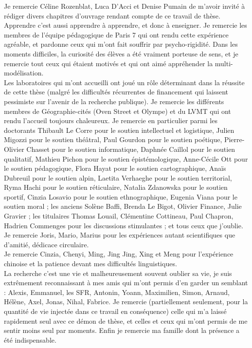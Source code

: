 Je remercie Céline Rozenblat, Luca D'Acci et Denise Pumain de m'avoir invité à rédiger divers chapitres d'ouvrage rendant compte de ce travail de thèse.
\\



Apprendre c'est aussi apprendre à apprendre, et donc à enseigner. Je remercie les membres de l'équipe pédagogique de Paris 7 qui ont rendu cette expérience agréable, et pardonne ceux qui m'ont fait souffrir par psycho-rigidité. Dans les moments difficiles, la curiosité des élèves a été vraiment porteuse de sens, et je remercie tout ceux qui étaient motivés et qui ont aimé appréhender la multi-modélisation.\\

Les laboratoires qui m'ont accueilli ont joué un rôle déterminant dans la réussite de cette thèse (malgré les difficultés récurrentes de financement qui laissent pessimiste sur l'avenir de la recherche publique). Je remercie les différents membres de Géographie-cités (Oven Street et Olympe) et du LVMT qui ont rendu l'accueil toujours chaleureux. Je remercie en particulier parmi les doctorants Thibault Le Corre pour le soutien intellectuel et logistique, Julien Migozzi pour le soutien théâtral, Paul Gourdon pour le soutien poétique, Pierre-Olivier Chasset pour le soutien informatique, Daphnée Caillol pour le soutien qualitatif, Mathieu Pichon pour le soutien épistémologique, Anne-Cécile Ott pour le soutien pédagogique, Flora Hayat pour le soutien cartographique, Anaïs Dubreuil pour le soutien alpin, Laetita Verhaeghe pour le soutien territorial, Ryma Hachi pour le soutien réticulaire, Natalia Zdanowska pour le soutien sportif, Cinzia Losavio pour le soutien ethnographique, Eugenia Viana pour le soutien moral ; les anciens Solène Baffi, Brenda Le Bigot, Olivier Finance, Julie Gravier ; les titulaires Thomas Louail, Clémentine Cottineau, Paul Chapron, Hadrien Commenges pour les discussions stimulantes ; et tous ceux que j'oublie.\\

Je remercie Joris, Mario, Marius pour les expériences autant scientifiques que d'amitié, dédicace circulaire.\\

Je remercie Cinzia, Chenyi, Ming, Jing Jing, Xing et Meng pour l'expérience chinoise et la patience devant mes difficultés linguistiques.\\


La recherche c'est une vie et malheureusement souvent oublier sa vie, je suis extrêmement reconnaissant à mes amis qui m'ont permis d'en garder un semblant : Alexis, Emmanuel, les SFR, Antonin, Yoann, Maximilien, Simon, Arnaud, Hélène, Axel, Jonas, Nihal, Fabrice. Je remercie (partiellement seulement, pour la quantité de vie injectée dans ce travail en conséquence) celle qui m'a laissé rapidement seul avec ce démon de thèse, et celles et ceux qui m'ont permis de me sentir moins seul par moments. Enfin je remercie ma famille dont la présence a été indispensable.


